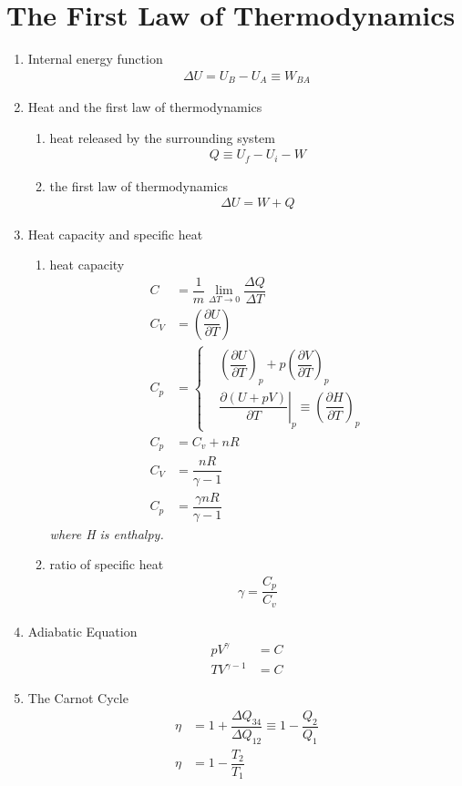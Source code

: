 \documentclass[10.5pt, a4paper, oneside]{article}
\def\D{\partial}
\numberwithin{equation}{section}%
\begin{document}
\section{The First Law of Thermodynamics}
\begin{multicols}{2}
	\begin{enumerate}
		\item Internal energy function
			\begin{align}
				\Delta U = U_B - U_A \equiv W_{BA}
			\end{align}
		\item Heat and the first law of thermodynamics
			\begin{enumerate}
				\item heat released by the surrounding system
					\begin{align}
						Q \equiv U_f - U_i -W
					\end{align}
				\item the first law of thermodynamics
					\begin{align}
						\Delta U = W + Q
					\end{align}
			\end{enumerate}
		\item Heat capacity and specific heat
			\begin{enumerate}
				\item heat capacity
				\begin{align}
					C &= \dfrac{1}{m}\lim\limits_{\Delta T \rightarrow 0}\dfrac{\Delta Q}{\Delta T}
					\\
					C_V &= \left(\dfrac{\D U}{\D T}\right)
					\\
					C_p &= 
					\left\{\begin{aligned}
					& \left(\dfrac{\D U}{\D T}\right)_p + p\left(\dfrac{\D V}{\D T}\right)_p
					\\
					& \left.\dfrac{\D(U + pV)}{\D T}\right|_p \equiv \left(\dfrac{\D H}{\D T}\right)_p
					\end{aligned}\right.\\
					C_p &= C_v + nR\\
					C_V &= \dfrac{nR}{\gamma - 1}\\
					C_p &= \dfrac{\gamma nR}{\gamma - 1}
				\end{align}
				\textit{where H is enthalpy.}
				\item ratio of specific heat
				\begin{align}
					\gamma = \dfrac{C_p}{C_v}
				\end{align}
			\end{enumerate}
		\item Adiabatic Equation
		\begin{align}
			pV^\gamma &= C\\
			TV^{\gamma - 1} &= C
		\end{align}
		\item The Carnot Cycle
		\begin{align}
			\eta &= 1 + \dfrac{\Delta Q_{34}}{\Delta Q_{12}} \equiv 1 - \dfrac{Q_2}{Q_1}
			\\
			\eta &= 1 - \dfrac{T_2}{T_1}
		\end{align}
	\end{enumerate}
\end{multicols}
\end{document}
